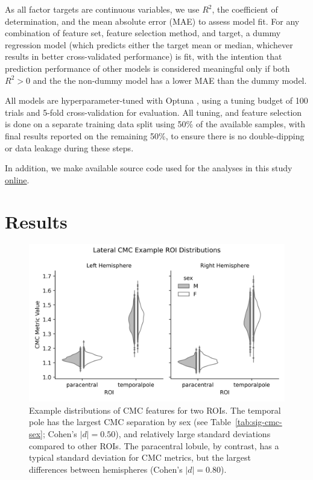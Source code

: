 \documentclass{article}
\begin{document}
As all factor targets are continuous variables, we use \(R^2\), the
coefficient of determination, and the mean absolute error (MAE) to assess
model fit. For any combination of feature set, feature selection method, and
target, a dummy regression model (which predicts either the target mean or
median, whichever results in better cross-validated performance) is fit, with
the intention that prediction performance of other models is considered
meaningful only if both \(R^2 > 0\) and the the non-dummy model has a lower MAE
than the dummy model.

All models are hyperparameter-tuned with Optuna \citep{Optuna2019}, using a
tuning budget of 100 trials and 5-fold cross-validation for evaluation. All
tuning, and feature selection is done on a separate training data split using
50\% of the available samples, with final results reported on the remaining
50\%, to ensure there is no double-dipping or data leakage during these
steps.

In addition, we make available source code used for the analyses in this
study \href{https://github.com/stfxecutables/cortical_congruence}{online}.


\section{Results}


\begin{figure}
	\centering
	\includegraphics[width=6.5in]{figures/example_violins.png}
	\caption{Example distributions of CMC features for two ROIs. The temporal
	pole has the largest CMC separation by sex (see
	Table~\ref{tab:sig-cmc-sex}; Cohen's \(|d|=0.50\)), and relatively large
	standard deviations compared to other ROIs. The paracentral lobule, by
	contrast, has a typical standard deviation for CMC metrics, but the largest
	differences between hemispheres (Cohen's \(|d|=0.80\)).}
	\label{fig:violins}
\end{figure}
\end{document}
